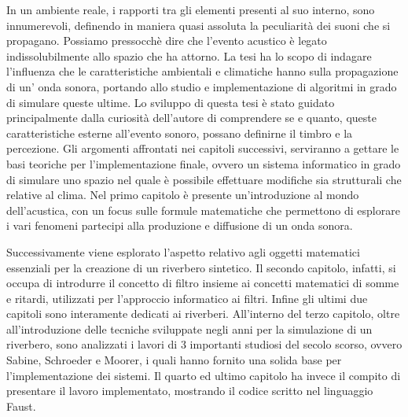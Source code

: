 In un ambiente reale, i rapporti tra gli elementi presenti al suo interno, sono innumerevoli, definendo in maniera quasi assoluta la peculiarità dei suoni che si propagano. Possiamo pressocchè dire che l’evento acustico è legato indissolubilmente allo spazio che ha attorno. La tesi ha lo scopo di indagare l’influenza che le caratteristiche ambientali e climatiche hanno sulla propagazione di un’ onda sonora, portando allo studio e implementazione di algoritmi in grado di simulare queste ultime. Lo sviluppo di questa tesi è stato guidato principalmente dalla curiosità dell’autore di comprendere se e quanto, queste caratteristiche esterne all’evento sonoro, possano definirne il timbro e la percezione. 
Gli argomenti affrontati nei capitoli successivi, serviranno a gettare le basi teoriche per l’implementazione finale, ovvero un sistema informatico in grado di simulare uno spazio nel quale è possibile effettuare modifiche sia strutturali che relative al clima.
Nel primo capitolo è presente un’introduzione al mondo dell’acustica, con un focus sulle formule matematiche che permettono di esplorare i vari fenomeni partecipi alla produzione e diffusione di un onda sonora.

Successivamente viene esplorato l’aspetto relativo agli oggetti matematici essenziali per la creazione di un riverbero sintetico. Il secondo capitolo, infatti, si occupa di introdurre il concetto di filtro insieme ai concetti matematici di somme e ritardi, utilizzati per l’approccio informatico ai filtri.
Infine gli ultimi due capitoli sono interamente dedicati ai riverberi. All’interno del terzo capitolo, oltre all’introduzione delle tecniche sviluppate negli anni per la simulazione di un riverbero, sono analizzati i lavori di 3 importanti studiosi del secolo scorso, ovvero Sabine, Schroeder e Moorer, i quali hanno fornito una solida base per l’implementazione dei sistemi. Il quarto ed ultimo capitolo ha invece il compito di presentare il lavoro implementato, mostrando il codice scritto nel linguaggio Faust.
